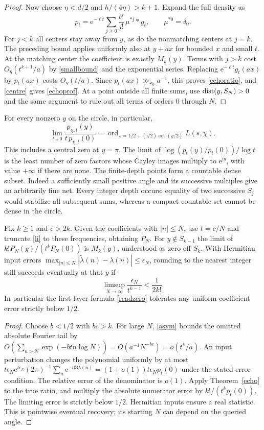 \documentclass[11pt,letterpaper]{article}
\newcommand{\I}{\mathrm i}\newcommand{\e}{\mathrm e}
\theoremstyle{plain}
\theoremstyle{definition}\newtheorem{example}[theorem]{Example}
\begin{document}
\begin{proof}
Now choose $\eta<d/2$ and $h/(4\eta)>k+1$. Expand the full density as
\[
 p_t=\e^{-\ell t}\sum_{j\ge0}\frac{t^j}{j!}\,\mu^{*j}*g_t,
 \qquad\mu^{*0}=\delta_0.
\]
For $j<k$ all centers stay away from $y$, as do the nonmatching centers at $j=k$. The preceding bound applies uniformly also at $y+ax$ for bounded $x$ and small $t$. At the matching center the coefficient is exactly $M_k(y)$. Terms with $j>k$ cost $O_\eta(t^{k+1}/a)$ by \eqref{smallbound} and the exponential series. Replacing $\e^{-\ell t}g_t(ax)$ by $p_t(ax)$ costs $O_\eta(t/a)$. Since $p_t(ax)\gg_{x_0}a^{-1}$, this proves \eqref{echoratio}, and \eqref{centre} gives \eqref{echoprof}. At a point outside all finite sums, use $\operatorname{dist}(y,S_N)>0$ and the same argument to rule out all terms of orders $0$ through $N$.
\end{proof}

For every nonzero $y$ on the circle, in particular,
\begin{equation}\label{readzero}
 \lim_{t\downarrow0}\frac{p_{\chi,t}(y)}{t\,p_{\chi,t}(0)}
 =\operatorname{ord}_{\,s=1/2+(\I/2)\cot(y/2)}L(s,\chi).
\end{equation}
This includes a central zero at $y=\pi$. The limit of $\log(p_t(y)/p_t(0))/\log t$ is the least number of zero factors whose Cayley images multiply to $\e^{\I y}$, with value $+\infty$ if there are none. The finite-depth points form a countable dense subset. Indeed a sufficiently small positive angle and its successive multiples give an arbitrarily fine net. Every integer depth occurs: equality of two successive $S_j$ would stabilize all subsequent sums, whereas a compact countable set cannot be dense in the circle.

\begin{corollary}\label{finite-li}
Fix $k\ge1$ and $c>2k$. Given the coefficients with $|n|\le N$, use $t=c/N$ and truncate \eqref{li} to these frequencies, obtaining $P_N$. For $y\notin S_{k-1}$ the limit of $k!P_N(y)/(t^kP_N(0))$ is $M_k(y)$, understood as zero off $S_k$. With Hermitian input errors $\max_{|n|\le N}|\widetilde\lambda(n)-\lambda(n)|\le\epsilon_N$, rounding to the nearest integer still succeeds eventually at that $y$ if
\[
                 \limsup_{N\to\infty}\frac{\epsilon_N}{t^{k-1}}<\frac1{2k!}.
\]
In particular the first-layer formula \eqref{readzero} tolerates any uniform coefficient error strictly below $1/2$.
\end{corollary}
\begin{proof}
Choose $b<1/2$ with $bc>k$. For large $N$, \eqref{asym} bounds the omitted absolute Fourier tail by
$O(\sum_{n>N}\exp(-bt n\log N))=O(a^{-1}N^{-bc})=o(t^k/a)$.
An input perturbation changes the polynomial uniformly by at most
$t\epsilon_N\e^{t\epsilon_N}(2\pi)^{-1}\sum_n\e^{-t\Re\lambda(n)}
=(1+o(1))t\epsilon_Np_t(0)$ under the stated error condition. The relative error of the denominator is $o(1)$. Apply Theorem~\ref{echo} to the true ratio, and multiply the absolute numerator error by $k!/(t^k p_t(0))$. The limiting error is strictly below $1/2$. Hermitian inputs ensure a real statistic. This is pointwise eventual recovery; its starting $N$ can depend on the queried angle.
\end{proof}
\end{document}
